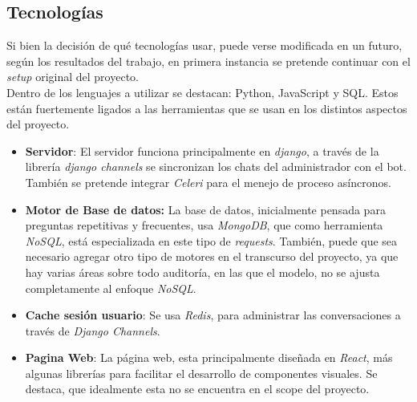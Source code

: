 \documentclass[guia]{upropuesta}
\begin{document}
    \subsection{Tecnologías}
        Si bien la decisión de qué tecnologías usar, puede verse modificada en un futuro, según los resultados del trabajo, en primera instancia se pretende continuar con el \textit{setup} original del proyecto.\\
        Dentro de los lenguajes a utilizar se destacan: Python, JavaScript y SQL. Estos están fuertemente ligados a las herramientas que se usan en los distintos aspectos del proyecto.
        \begin{itemize}
            \item \textbf{Servidor}: El servidor funciona principalmente en \textit{django}, a través de la librería \textit{django channels} se sincronizan los chats del administrador con el bot. También se pretende integrar \textit{Celeri} para el menejo de proceso asíncronos.
            \item \textbf{Motor de Base de datos:} La base de datos, inicialmente pensada para preguntas repetitivas y frecuentes, usa \textit{MongoDB}, que como herramienta \textit{NoSQL}, está especializada en este tipo de \textit{requests}. También, puede que sea necesario agregar otro tipo de motores en el transcurso del proyecto, ya que hay varias áreas sobre todo auditoría, en las que el modelo, no se ajusta completamente al enfoque \textit{NoSQL}.
            \item \textbf{Cache sesión usuario}: Se usa \textit{Redis}, para administrar las conversaciones a través de \textit{Django Channels}.
            \item \textbf{Pagina Web}: La página web, esta principalmente diseñada en \textit{React}, más algunas librerías para facilitar el desarrollo de componentes visuales. Se destaca, que idealmente esta no se encuentra en el scope del proyecto.
        \end{itemize}
        

    
\newpage



\end{document}
